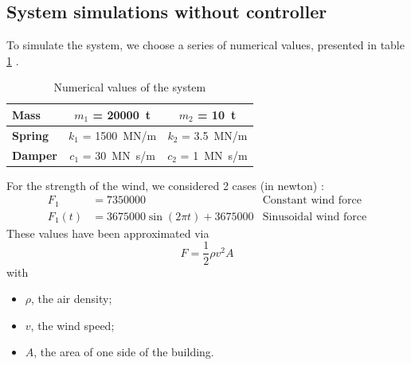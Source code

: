 \documentclass[a4paper, 12pt]{article}
\begin{document}
    \subsection{System simulations without controller}
    To simulate the system, we choose a series of numerical values, presented in table \ref{tab:numerical_values} \cite{science_direct_2}.
    \begin{table}[H]
        \centering
        \begin{tabular}{|l|c|c|}
            \hline
            {\bf Mass} & $m_1$ = \SI{20000}{\tonne} & $m_2$ = \SI{10}{\tonne}\\ \hline
            {\bf Spring} & $k_1$ = \SI{1500}{\mega\newton/\meter} & $k_2$ = \SI{3.5}{\mega\newton/\meter}\\ \hline
            {\bf Damper} & $c_1$ = \SI{30}{\mega\newton\second/\meter} & $c_2$ = \SI{1}{\mega\newton\second/\meter}\\ \hline
        \end{tabular}
        \caption{Numerical values of the system}
        \label{tab:numerical_values}
    \end{table}
    For the strength of the wind, we considered 2 cases (in newton) :
    \begin{align*}
        F_1 &= \num{7350000} & \text{Constant wind force}\\
        F_1(t) &= \num{3675000}\sin(2\pi t) + \num{3675000} & \text{Sinusoidal wind force}
    \end{align*}
    These values have been approximated via
    \begin{equation*}
        F = \frac{1}{2}\rho v^2A
    \end{equation*}
    with
    \begin{itemize}
        \item $\rho$, the air density;
        \item $v$, the wind speed;
        \item $A$, the area of one side of the building.
    \end{itemize}
\end{document}
